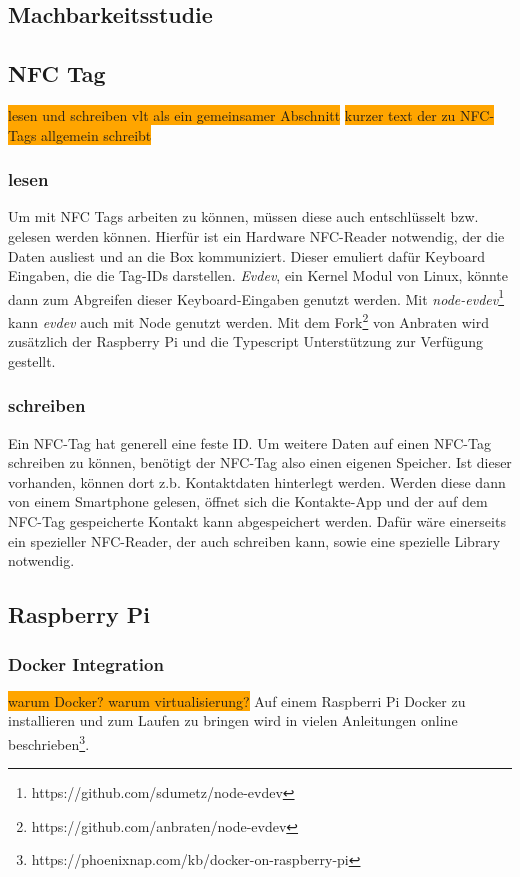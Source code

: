 \documentclass[10pt, a4paper]{article}
\begin{document}
\begin{onehalfspace}
\section{Machbarkeitsstudie}
\label{machbarkeitsstudie}

\subsection{NFC Tag}
\colorbox{orange}{lesen und schreiben vlt als ein gemeinsamer Abschnitt}
\colorbox{orange}{kurzer text der zu NFC-Tags allgemein schreibt}
\subsubsection*{lesen}
Um mit NFC Tags arbeiten zu können, müssen diese auch entschlüsselt bzw. gelesen werden können.
Hierfür ist ein Hardware NFC-Reader notwendig, der die Daten ausliest und an die Box kommuniziert.
Dieser emuliert dafür Keyboard Eingaben, die die Tag-IDs darstellen.
\textit{Evdev}, ein Kernel Modul von Linux, könnte dann zum Abgreifen dieser Keyboard-Eingaben genutzt werden. Mit \textit{node-evdev}\footnote{https://github.com/sdumetz/node-evdev} kann \textit{evdev} auch mit Node genutzt werden. Mit dem Fork\footnote{https://github.com/anbraten/node-evdev} von Anbraten wird zusätzlich der Raspberry Pi und die Typescript Unterstützung zur Verfügung gestellt.

\subsubsection*{schreiben}
Ein NFC-Tag hat generell eine feste ID.
Um weitere Daten auf einen NFC-Tag schreiben zu können, benötigt der NFC-Tag also einen eigenen Speicher.
Ist dieser vorhanden, können dort z.b. Kontaktdaten hinterlegt werden. Werden diese dann von einem Smartphone gelesen, öffnet sich die Kontakte-App und der auf dem NFC-Tag gespeicherte Kontakt kann abgespeichert werden.
Dafür wäre einerseits ein spezieller NFC-Reader, der auch schreiben kann, sowie eine spezielle Library notwendig.

\subsection{Raspberry Pi}
\subsubsection{Docker Integration}
\colorbox{orange}{warum Docker? warum virtualisierung?}
Auf einem Raspberri Pi Docker zu installieren und zum Laufen zu bringen wird in vielen Anleitungen online beschrieben\footnote{https://phoenixnap.com/kb/docker-on-raspberry-pi}.


\end{onehalfspace}
\end{document}
